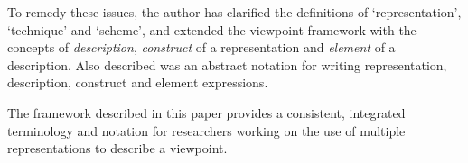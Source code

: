 \documentclass[11pt,oribibl]{llncs}
\begin{document}
To remedy these issues, the author has clarified the definitions of `representation', `technique' and `scheme', and extended the viewpoint framework with the concepts of \emph{description}, \emph{construct} of a representation and \emph{element} of a description. Also described was an abstract notation for writing representation, description, construct and element expressions.

The framework described in this paper provides a consistent, integrated terminology and notation for researchers working on the use of multiple representations to describe a viewpoint. 




\end{document}

